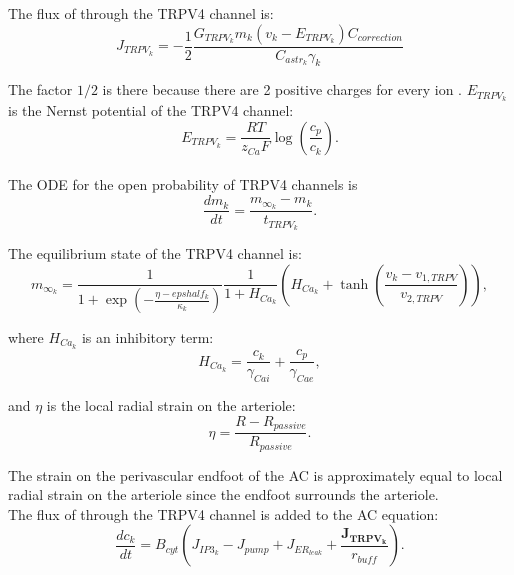 			The flux of \ca through the TRPV4 channel is:
				\begin{equation}
				J_{TRPV_k} = -\frac{1}{2} \frac{ G_{TRPV_k} m_k (v_k - E_{TRPV_k}) C_{correction} }{C_{astr_k} \gamma_k}
				\end{equation}
			
			The factor $1/2$ is there because there are 2 positive charges for every \ca ion \citep{Witthoft2013a}. 
			$E_{TRPV_k}$ is the Nernst potential of the TRPV4 channel:
				\begin{equation}
				E_{TRPV_k} = \frac{RT}{z_{Ca} F} \log \left(\frac{c_p}{c_k} \right).
				\end{equation}
			\\	
					
			The ODE for the open probability of TRPV4 channels is
				\begin{equation}
				\frac{d m_k}{dt} = \frac{m_{\infty_k} - m_k}{t_{TRPV_k}}.
				\end{equation}
						
			The equilibrium state of the TRPV4 channel is:
				\begin{equation}
				m_{\infty_k} = \frac{1}{1+\exp \left( {-\frac{\eta - epshalf_k}{\kappa_k}} \right) } 
								\frac{1}{1 + H_{Ca_k}} \left( H_{Ca_k} + \tanh \left( \frac{v_k - v_{1,TRPV}}{v_{2,TRPV}} \right) \right), 
				\end{equation}
			
			where $H_{Ca_k}$ is an inhibitory term:
				\begin{equation}
				H_{Ca_k} = \frac{c_k}{\gamma_{Cai}} + \frac{c_p}{\gamma_{Cae}},
				\end{equation}
			
			and $\eta$ is the local radial strain on the arteriole:
				\begin{equation}
				\eta = \frac{R - R_{passive}}{R_{passive}}.
				\end{equation}
			
			The strain on the perivascular endfoot of the AC is approximately equal to local radial strain on the arteriole since the endfoot surrounds the arteriole.	
			\\
				
			The flux of \ca through the TRPV4 channel is added to the AC \ca equation:
				\begin{equation}
				\frac{d c_k}{dt} = B_{cyt} \left( J_{IP3_k} - J_{pump} + J_{ER_{leak}} + \frac{\bm{{J_{TRPV_k}}}}{r_{buff}} \right). 
				\end{equation}
			

